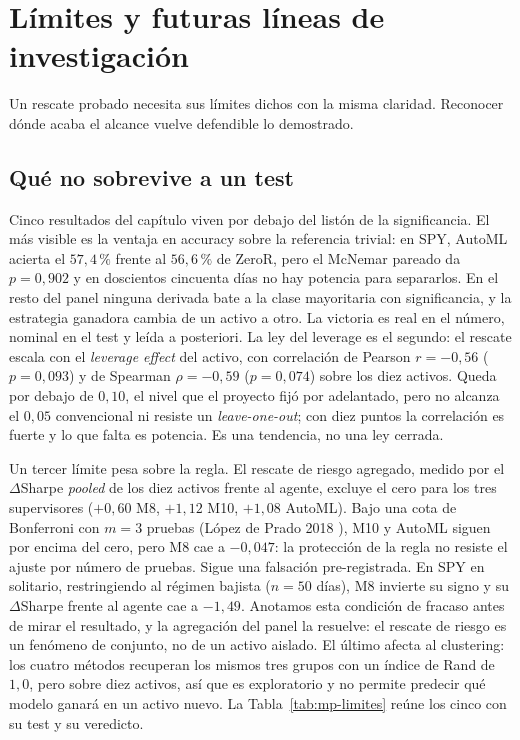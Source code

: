 \section{Límites y futuras líneas de investigación}
\label{sec:mp-limites}


Un rescate probado necesita sus límites dichos con la misma claridad. Reconocer dónde acaba el alcance vuelve defendible lo demostrado.

\subsection{Qué no sobrevive a un test}
\label{sec:mp-lim-tests}

Cinco resultados del capítulo viven por debajo del listón de la significancia. El más visible es la ventaja en accuracy sobre la referencia trivial: en SPY, AutoML acierta el $57{,}4\,\%$ frente al $56{,}6\,\%$ de ZeroR, pero el McNemar pareado da $p = 0{,}902$ y en doscientos cincuenta días no hay potencia para separarlos. En el resto del panel ninguna derivada bate a la clase mayoritaria con significancia, y la estrategia ganadora cambia de un activo a otro. La victoria es real en el número, nominal en el test y leída a posteriori. La ley del leverage es el segundo: el rescate escala con el \emph{leverage effect} del activo, con correlación de Pearson $r = -0{,}56$ ($p = 0{,}093$) y de Spearman $\rho = -0{,}59$ ($p = 0{,}074$) sobre los diez activos. Queda por debajo de $0{,}10$, el nivel que el proyecto fijó por adelantado, pero no alcanza el $0{,}05$ convencional ni resiste un \emph{leave-one-out}; con diez puntos la correlación es fuerte y lo que falta es potencia. Es una tendencia, no una ley cerrada.

Un tercer límite pesa sobre la regla. El rescate de riesgo agregado, medido por el $\Delta$Sharpe \emph{pooled} de los diez activos frente al agente, excluye el cero para los tres supervisores ($+0{,}60$ M8, $+1{,}12$ M10, $+1{,}08$ AutoML). Bajo una cota de Bonferroni con $m = 3$ pruebas (López de Prado 2018 \cite{lopezdeprado2018}), M10 y AutoML siguen por encima del cero, pero M8 cae a $-0{,}047$: la protección de la regla no resiste el ajuste por número de pruebas. Sigue una falsación pre-registrada. En SPY en solitario, restringiendo al régimen bajista ($n = 50$ días), M8 invierte su signo y su $\Delta$Sharpe frente al agente cae a $-1{,}49$. Anotamos esta condición de fracaso antes de mirar el resultado, y la agregación del panel la resuelve: el rescate de riesgo es un fenómeno de conjunto, no de un activo aislado. El último afecta al clustering: los cuatro métodos recuperan los mismos tres grupos con un índice de Rand de $1{,}0$, pero sobre diez activos, así que es exploratorio y no permite predecir qué modelo ganará en un activo nuevo. La Tabla~\ref{tab:mp-limites} reúne los cinco con su test y su veredicto.

